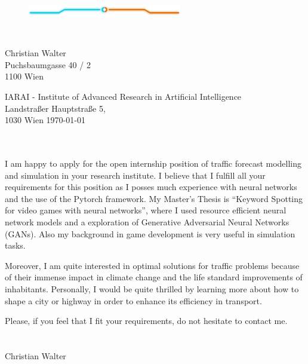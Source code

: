 \documentclass[11pt, a4paper]{article}
\begin{document}
\begin{center}
  \begin{figure}[h] \centering \includegraphics[width=0.6\textwidth]{../../lib/figs/tron_blue_orange_up} \end{figure}
  \\
\end{center}

\vspace{1cm}
Christian Walter\\
Puchsbaumgasse 40 / 2\\
1100 Wien\\
\vspace{1cm}

IARAI - Institute of Advanced Research in Artificial Intelligence\\
Landstraßer Hauptstraße 5, \\
1030 Wien \hfill
\today\\
\vspace{1cm}

\\\\
I am happy to apply for the open internship position of traffic forecast modelling and simulation in your research institute.
I believe that I fulfill all your requirements for this position as I posses much experience with neural networks and the use of the Pytorch framework.
My Master's Thesis is \enquote{Keyword Spotting for video games with neural networks}, where I used resource efficient neural network models and a exploration of Generative Adversarial Neural Networks (GANs).
Also my background in game development is very useful in simulation tasks.

Moreover, I am quite interested in optimal solutions for traffic problems because of their immense impact in climate change and the life standard improvements of inhabitants.
Personally, I would be quite thrilled by learning more about how to shape a city or highway in order to enhance its efficiency in transport.

Please, if you feel that I fit your requirements, do not hesitate to contact me.\\

\\\\ Christian Walter
\end{document}
